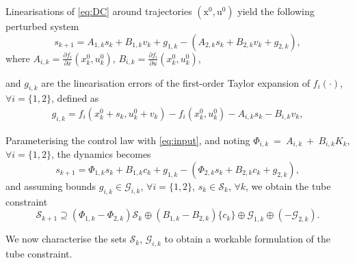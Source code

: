 \documentclass[letterpaper, 10 pt, conference]{ieeeconf}
\begin{document}
Linearisations of \eqref{eq:DC} around trajectories $(\bm{\mathrm{x}}^0, \bm{\mathrm{u}}^0)$ yield the following perturbed system
%
\begin{equation*}
s_{k+1} =A_{1, k} s_k + B_{1, k} v_k + g_{1, k} - (A_{2, k} s_k + B_{2, k} v_k + g_{2, k}), 
\end{equation*}
where $A_{i, k} = \frac{\partial f_i}{\partial x}(x_k^0, u_k^0)$, $B_{i, k} = \frac{\partial f_i}{\partial u}(x_k^0, u_k^0)$,
%

%
and $g_{i, k}$ are the linearisation errors of the first-order Taylor expansion of $f_i(\cdot)$, $\forall i=\{1, 2\}$, defined as
\begin{multline}
\label{eq:error1}
g_{i, k} = f_i(x^0_k + s_{k}, u^0_k + v_k) - f_i(x^0_k, u^0_k) - A_{i, k} s_k - B_{i, k} v_k, 
\end{multline}

Parameterising the control law with \eqref{eq:input}, and noting
$\Phi_{i, k}~=~A_{i, k}~+~B_{i, k} K_{k}$, $\forall i = \{1, 2\}$, the dynamics becomes
\begin{equation*}
s_{k+1} =\Phi_{1, k} s_k + B_{1, k} c_k + g_{1, k} - (\Phi_{2, k} s_k + B_{2, k} c_k +  g_{2, k}), 
\end{equation*}
and assuming bounds $g_{i, k} \in \mathcal{G}_{i, k}$, $\forall i = \{1, 2\}$, $s_k \in \mathcal{S}_k$, $\forall k$, we obtain the tube constraint 
%
\begin{equation}
\label{eq:tube}
\mathcal{S}_{k+1} \supseteq (\Phi_{1, k} - \Phi_{2, k})\mathcal{S}_k \oplus (B_{1, k} - B_{2, k}) \{c_k\} \oplus \mathcal{G}_{1, k} \oplus (-\mathcal{G}_{2, k}). 
\end{equation}

We now characterise the sets $\mathcal{S}_{k}$, $\mathcal{G}_{i, k}$ to obtain a workable formulation of the tube constraint.
\end{document}
